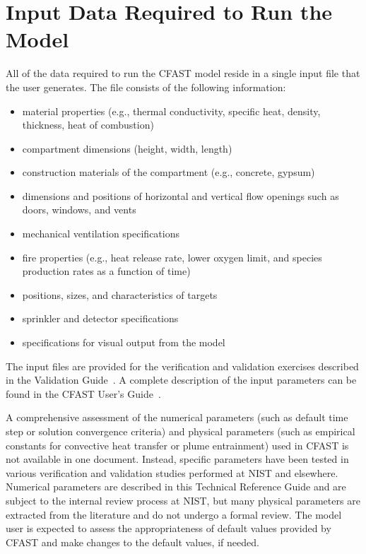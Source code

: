 \section{Input Data Required to Run the Model}

All of the data required to run the CFAST model reside in a single input file that the user generates. The file consists of the following information:
\begin{itemize}
\item material properties (e.g., thermal conductivity, specific heat, density, thickness, heat of combustion)
\item compartment dimensions (height, width, length)
\item construction materials of the compartment (e.g., concrete, gypsum)
\item dimensions and positions of horizontal and vertical flow openings such as doors, windows, and vents
\item mechanical ventilation specifications
\item fire properties (e.g., heat release rate, lower oxygen limit, and species production rates as a function of time)
\item positions, sizes, and characteristics of targets
\item sprinkler and detector specifications
\item specifications for visual output from the model
\end{itemize}
The input files are provided for the verification and validation exercises described in the Validation Guide~\cite{CFAST_Valid_Guide_8}. A complete description of the input parameters can be found in the CFAST User's Guide~\cite{CFAST_Users_Guide_8}.

A comprehensive assessment of the numerical parameters (such as default time step or solution convergence criteria) and physical parameters (such as empirical constants for convective heat transfer or plume entrainment) used in CFAST is not available in one document. Instead, specific parameters have been tested in various verification and validation studies performed at NIST and elsewhere. Numerical parameters are described in this Technical Reference Guide and are subject to the internal review process at NIST, but many physical parameters are extracted from the literature and do not undergo a formal review. The model user is expected to assess the appropriateness of default values provided by CFAST and make changes to the default values, if needed.




